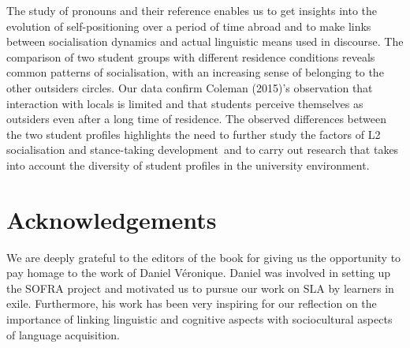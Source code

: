\documentclass[output=paper]{langscibook}
\begin{document}
The study of pronouns and their reference enables us to get insights into the evolution of self-positioning over a period of time abroad and to make links between socialisation dynamics and actual linguistic means used in discourse. The comparison of two student groups with different residence conditions reveals common patterns of socialisation, with an increasing sense of belonging to the other outsiders circles. Our data confirm Coleman (2015)’s observation that interaction with locals is limited and that students perceive themselves as outsiders even after a long time of residence. The observed differences between the two student profiles highlights the need to further study the factors of L2 socialisation and stance-taking development~and to carry out research that takes into account the diversity of student profiles in the university environment.

\section*{Acknowledgements}
We are deeply grateful to the editors of the book for giving us the opportunity to pay homage to the work of Daniel Véronique. Daniel was involved in setting up the SOFRA project and motivated us to pursue our work on SLA by learners in exile. Furthermore, his work has been very inspiring for our reflection on the importance of linking linguistic and cognitive aspects with sociocultural aspects of language acquisition.

\printbibliography[heading=subbibliography]
\end{document}
